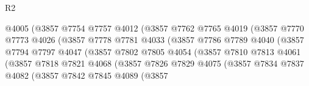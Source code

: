 \begin{lexlean}{R2}
\begin{coremodule}
                                  @4005
                                  (@3857
                                    @7754
                                    @7757
                                    @4012
                                    (@3857
                                      @7762
                                      @7765
                                      @4019
                                      (@3857
                                        @7770
                                        @7773
                                        @4026
                                        (@3857
                                          @7778
                                          @7781
                                          @4033
                                          (@3857
                                            @7786
                                            @7789
                                            @4040
                                            (@3857
                                              @7794
                                              @7797
                                              @4047
                                              (@3857
                                                @7802
                                                @7805
                                                @4054
                                                (@3857
                                                  @7810
                                                  @7813
                                                  @4061
                                                  (@3857
                                                    @7818
                                                    @7821
                                                    @4068
                                                    (@3857
                                                      @7826
                                                      @7829
                                                      @4075
                                                      (@3857
                                                        @7834
                                                        @7837
                                                        @4082
                                                        (@3857
                                                          @7842
                                                          @7845
                                                          @4089
                                                          (@3857

\end{coremodule}
\end{lexlean}
